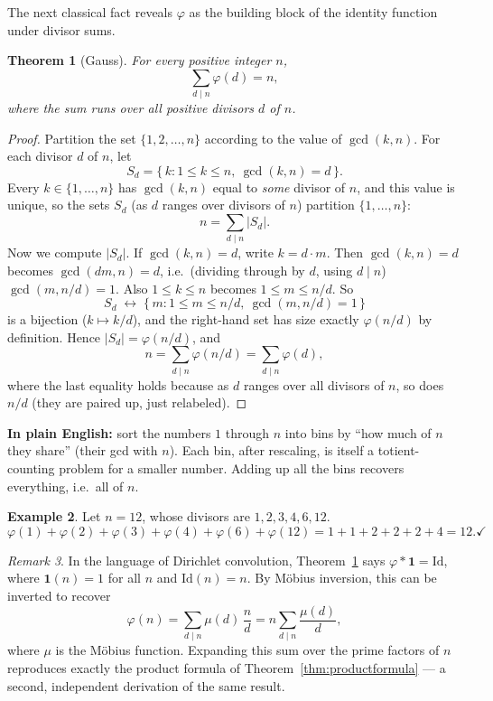 \documentclass[11pt]{article}
\newtheorem{theorem}{Theorem}[section]
\theoremstyle{definition}
\newtheorem{example}[theorem]{Example}
\theoremstyle{remark}
\newtheorem{remark}[theorem]{Remark}
\begin{document}
The next classical fact reveals $\varphi$ as the building block of the identity function under divisor sums.

\begin{theorem}[Gauss]\label{thm:gauss}
For every positive integer $n$,
\[
\sum_{d \mid n} \varphi(d) = n,
\]
where the sum runs over all positive divisors $d$ of $n$.
\end{theorem}

\begin{proof}
Partition the set $\{1, 2, \dots, n\}$ according to the value of $\gcd(k, n)$. For each divisor $d$ of $n$, let
\[
S_d = \{\, k : 1 \le k \le n,\ \gcd(k,n) = d \,\}.
\]
Every $k \in \{1,\dots,n\}$ has $\gcd(k,n)$ equal to \emph{some} divisor of $n$, and this value is unique, so the sets $S_d$ (as $d$ ranges over divisors of $n$) partition $\{1,\dots,n\}$:
\[
n = \sum_{d \mid n} |S_d|.
\]
Now we compute $|S_d|$. If $\gcd(k,n) = d$, write $k = d\cdot m$. Then $\gcd(k,n)=d$ becomes $\gcd(dm, n) = d$, i.e.\ (dividing through by $d$, using $d \mid n$) $\gcd(m, n/d) = 1$. Also $1 \le k \le n$ becomes $1 \le m \le n/d$. So
\[
S_d \;\longleftrightarrow\; \{\, m : 1 \le m \le n/d,\ \gcd(m, n/d) = 1 \,\}
\]
is a bijection ($k \mapsto k/d$), and the right-hand set has size exactly $\varphi(n/d)$ by definition. Hence $|S_d| = \varphi(n/d)$, and
\[
n = \sum_{d \mid n} \varphi(n/d) = \sum_{d \mid n} \varphi(d),
\]
where the last equality holds because as $d$ ranges over all divisors of $n$, so does $n/d$ (they are paired up, just relabeled).
\end{proof}

\noindent\textbf{In plain English:} sort the numbers $1$ through $n$ into bins by ``how much of $n$ they share'' (their gcd with $n$). Each bin, after rescaling, is itself a totient-counting problem for a smaller number. Adding up all the bins recovers everything, i.e.\ all of $n$.

\begin{example}
Let $n = 12$, whose divisors are $1,2,3,4,6,12$.
\[
\varphi(1)+\varphi(2)+\varphi(3)+\varphi(4)+\varphi(6)+\varphi(12) = 1+1+2+2+2+4 = 12. \checkmark
\]
\end{example}

\begin{remark}
In the language of Dirichlet convolution, Theorem~\ref{thm:gauss} says $\varphi * \mathbf{1} = \mathrm{Id}$, where $\mathbf{1}(n)=1$ for all $n$ and $\mathrm{Id}(n) = n$. By Möbius inversion, this can be inverted to recover
\[
\varphi(n) = \sum_{d \mid n} \mu(d)\,\frac{n}{d} = n\sum_{d\mid n}\frac{\mu(d)}{d},
\]
where $\mu$ is the Möbius function. Expanding this sum over the prime factors of $n$ reproduces exactly the product formula of Theorem~\ref{thm:productformula} — a second, independent derivation of the same result.
\end{remark}
\end{document}
